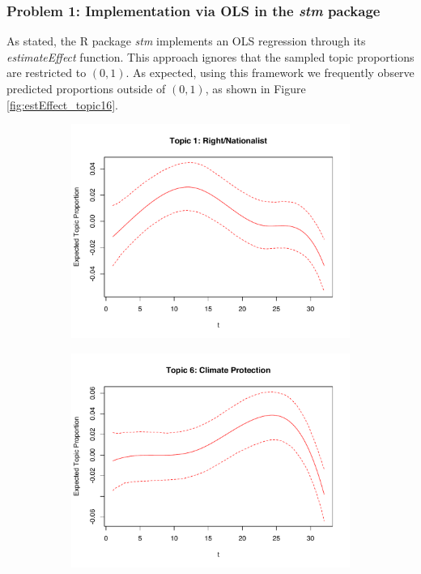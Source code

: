 \subsubsection{Problem 1: Implementation via OLS in the \textit{stm} package}

\noindent As stated, the R package \textit{stm} implements an OLS regression through its \textit{estimateEffect} function. This approach ignores that the sampled topic proportions are restricted to $(0,1)$. As expected, using this framework we frequently observe predicted proportions outside of $(0,1)$, as shown in Figure \ref{fig:estEffect_topic16}.\\

\begin{figure}[h!]
  \centering
  \captionsetup{justification=centering,margin=2cm}
  \begin{subfigure}[b]{0.4\linewidth}
    \includegraphics[width=\linewidth]{../plots/5_1/estEffect_topic1.pdf}
  \end{subfigure}
  \begin{subfigure}[b]{0.4\linewidth}
    \includegraphics[width=\linewidth]{../plots/5_1/estEffect_topic6.pdf}

\end{subfigure}
\end{figure}
